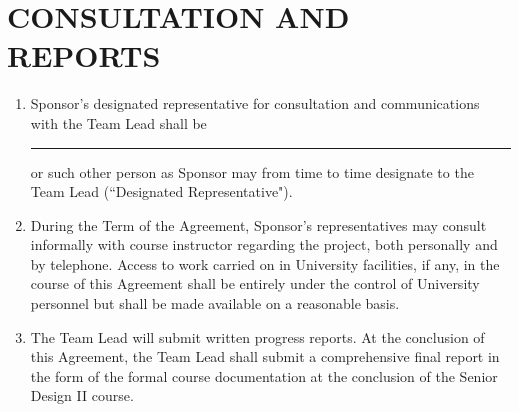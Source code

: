 \documentclass[11pt]{article}
\begin{document}
\section{CONSULTATION AND REPORTS}     
\begin{enumerate}  \itemsep4pt \parskip0pt 
\item  Sponsor's designated representative for consultation and       communications with the Team Lead shall be \\[3mm]  \rule{7cm}{0.4pt}    or such other person as Sponsor       may from time to time designate to the Team Lead (``Designated Representative").    

\item During the Term of the Agreement, Sponsor's representatives may       consult informally with course instructor regarding the       project, both personally and by telephone. Access to work carried       on in University facilities, if any, in the course of this Agreement shall       be entirely under the control of University personnel but shall be       made available on a reasonable basis.    

\item The Team Lead will submit written progress reports. At the conclusion of this Agreement, the Team Lead shall submit a comprehensive final report in the form of the formal course documentation at the conclusion of the Senior Design II course. 
\end{enumerate}
\end{document}
